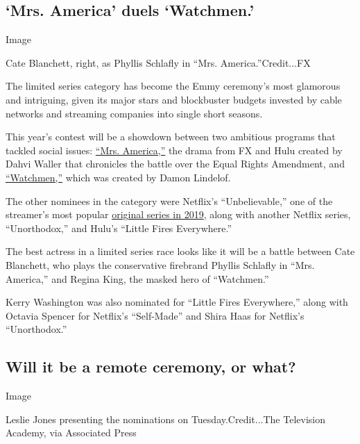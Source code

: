 \hypertarget{mrs-america-duels-watchmen}{%
\subsection{`Mrs. America' duels
`Watchmen.'}\label{mrs-america-duels-watchmen}}

Image

Cate Blanchett, right, as Phyllis Schlafly in ``Mrs.
America.''Credit...FX

The limited series category has become the Emmy ceremony's most
glamorous and intriguing, given its major stars and blockbuster budgets
invested by cable networks and streaming companies into single short
seasons.

This year's contest will be a showdown between two ambitious programs
that tackled social issues:
\href{https://www.nytimes.com/2020/04/14/arts/television/mrs-america-review.html}{``Mrs.
America,''} the drama from FX and Hulu created by Dahvi Waller that
chronicles the battle over the Equal Rights Amendment, and
\href{https://www.nytimes.com/2019/12/16/arts/television/watchmen-finale.html}{``Watchmen,''}
which was created by Damon Lindelof.

The other nominees in the category were Netflix's ``Unbelievable,'' one
of the streamer's most popular
\href{https://www.nytimes.com/2019/10/17/business/media/netflix-top-ten-movies-tv-shows.html}{original
series in 2019}, along with another Netflix series, ``Unorthodox,'' and
Hulu's ``Little Fires Everywhere.''

The best actress in a limited series race looks like it will be a battle
between Cate Blanchett, who plays the conservative firebrand Phyllis
Schlafly in ``Mrs. America,'' and Regina King, the masked hero of
``Watchmen.''

Kerry Washington was also nominated for ``Little Fires Everywhere,''
along with Octavia Spencer for Netflix's ``Self-Made'' and Shira Haas
for Netflix's ``Unorthodox.''

\hypertarget{will-it-be-a-remote-ceremony-or-what}{%
\subsection{Will it be a remote ceremony, or
what?}\label{will-it-be-a-remote-ceremony-or-what}}

Image

Leslie Jones presenting the nominations on Tuesday.Credit...The
Television Academy, via Associated Press

